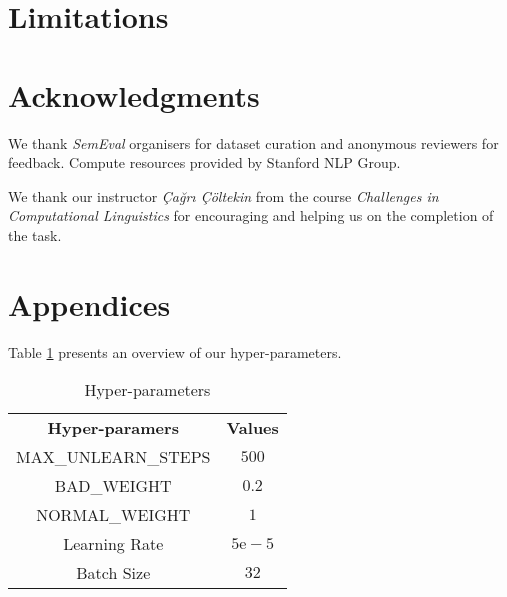 \documentclass[11pt]{article}
\begin{document}
\section*{Limitations}

\section*{Acknowledgments}
We thank \textit{SemEval} organisers for dataset curation and anonymous reviewers for feedback. Compute resources provided by Stanford NLP Group.

We thank our instructor \textit{Çağrı Çöltekin} from the course \textit{Challenges in Computational Linguistics} for encouraging and helping us on the completion of the task.






\appendix

\section{Appendices}

Table \ref{tab:hyper} presents an overview of our hyper-parameters.

\begin{table}[h]
    \centering
    \begin{tabular}{c|c}
        \hline
        \textbf{Hyper-paramers} & \textbf{Values} \\
        MAX\_UNLEARN\_STEPS & $500$ \\
        BAD\_WEIGHT & $0.2$ \\
        NORMAL\_WEIGHT & $1$ \\
        Learning Rate & $5\mathrm{e}-5$ \\
        Batch Size & $32$ \\
        \hline
    \end{tabular}
    \caption{Hyper-parameters}
    \label{tab:hyper}
\end{table}

\label{sec:appendix}
\end{document}
